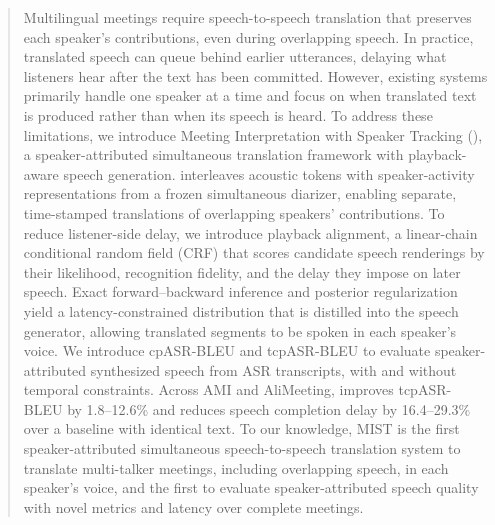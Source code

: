 \begin{abstract}

Multilingual meetings require speech-to-speech translation that preserves each speaker's contributions, even during overlapping speech. In practice, translated speech can queue behind earlier utterances, delaying what listeners hear after the text has been committed. However, existing systems primarily handle one speaker at a time and focus on when translated text is produced rather than when its speech is heard. To address these limitations, we introduce Meeting Interpretation with Speaker Tracking (\sys{}), a speaker-attributed simultaneous translation framework with playback-aware speech generation. \sys{} interleaves acoustic tokens with speaker-activity representations from a frozen simultaneous diarizer, enabling separate, time-stamped translations of overlapping speakers' contributions. To reduce listener-side delay, we introduce playback alignment, a linear-chain conditional random field (CRF) that scores candidate speech renderings by their likelihood, recognition fidelity, and the delay they impose on later speech. Exact forward--backward inference and posterior regularization yield a latency-constrained distribution that is distilled into the speech generator, allowing translated segments to be spoken in each speaker's voice. We introduce cpASR-BLEU and tcpASR-BLEU to evaluate speaker-attributed synthesized speech from ASR transcripts, with and without temporal constraints. Across AMI and AliMeeting, \sys{} improves tcpASR-BLEU by 1.8–12.6\% and reduces speech completion delay by 16.4–29.3\% over a baseline with identical text. To our knowledge, MIST is the first speaker-attributed simultaneous speech-to-speech translation system to translate multi-talker meetings, including overlapping speech, in each speaker's voice, and the first to evaluate speaker-attributed speech quality with novel metrics and latency over complete meetings.


\end{abstract}
